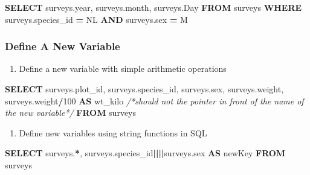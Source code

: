 \documentclass[
]{book}
\newenvironment{Shaded}{\begin{snugshade}}{\end{snugshade}}
\newcommand{\CommentTok}[1]{\textcolor[rgb]{0.56,0.35,0.01}{\textit{#1}}}
\newcommand{\DataTypeTok}[1]{\textcolor[rgb]{0.13,0.29,0.53}{#1}}
\newcommand{\DecValTok}[1]{\textcolor[rgb]{0.00,0.00,0.81}{#1}}
\newcommand{\KeywordTok}[1]{\textcolor[rgb]{0.13,0.29,0.53}{\textbf{#1}}}
\newcommand{\NormalTok}[1]{#1}
\newcommand{\OperatorTok}[1]{\textcolor[rgb]{0.81,0.36,0.00}{\textbf{#1}}}
\newcommand{\StringTok}[1]{\textcolor[rgb]{0.31,0.60,0.02}{#1}}
\providecommand{\tightlist}{%
  \setlength{\itemsep}{0pt}\setlength{\parskip}{0pt}}
\begin{document}
\begin{Shaded}
\begin{Highlighting}[]
\KeywordTok{SELECT} 
\NormalTok{  surveys.}\DataTypeTok{year}\NormalTok{, surveys.}\DataTypeTok{month}\NormalTok{, surveys.}\DataTypeTok{Day}
\KeywordTok{FROM} 
\NormalTok{ surveys}
\KeywordTok{WHERE}
\NormalTok{  surveys.species\_id }\OperatorTok{=} \StringTok{\textquotesingle{}NL\textquotesingle{}} \KeywordTok{AND}
\NormalTok{  surveys.sex }\OperatorTok{=} \StringTok{\textquotesingle{}M\textquotesingle{}}
\end{Highlighting}
\end{Shaded}

\hypertarget{define-a-new-variable}{%
\subsubsection{Define A New Variable}\label{define-a-new-variable}}

\begin{enumerate}
\def\labelenumi{\arabic{enumi}.}
\tightlist
\item
  Define a new variable with simple arithmetic operations
\end{enumerate}

\begin{Shaded}
\begin{Highlighting}[]
\KeywordTok{SELECT} 
\NormalTok{    surveys.plot\_id, }
\NormalTok{    surveys.species\_id, }
\NormalTok{    surveys.sex, }
\NormalTok{    surveys.weight, }
\NormalTok{    surveys.weight}\OperatorTok{/}\DecValTok{100} \KeywordTok{AS}\NormalTok{ wt\_kilo  }\CommentTok{/*should not the pointer in front of the name of the new variable*/} 
\KeywordTok{FROM} 
\NormalTok{   surveys}
\end{Highlighting}
\end{Shaded}

\begin{enumerate}
\def\labelenumi{\arabic{enumi}.}
\setcounter{enumi}{1}
\tightlist
\item
  Define new variables using string functions in SQL
\end{enumerate}

\begin{Shaded}
\begin{Highlighting}[]
\KeywordTok{SELECT}\NormalTok{ surveys.}\OperatorTok{*}\NormalTok{, }
\NormalTok{       surveys.species\_id}\OperatorTok{||}\StringTok{\textquotesingle{}{-}\textquotesingle{}}\OperatorTok{||}\NormalTok{surveys.sex }\KeywordTok{AS}\NormalTok{ newKey}
\KeywordTok{FROM}\NormalTok{ surveys}
\end{Highlighting}
\end{Shaded}
\end{document}

